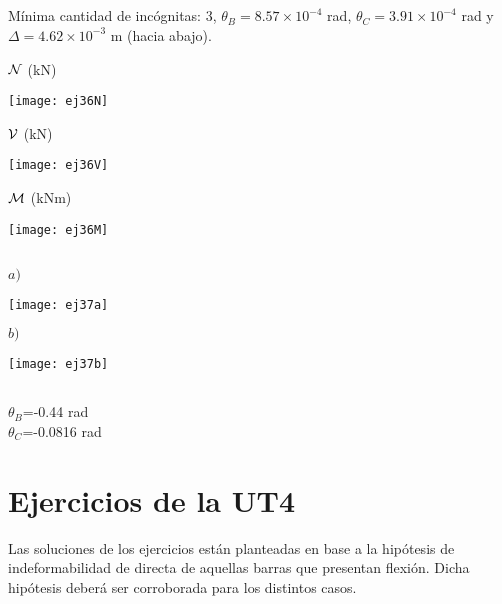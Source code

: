 \subsection{}

Mínima cantidad de incógnitas: 3, $\theta_B = 8.57 \times 10^{-4}$ rad, $\theta_C = 3.91 \times 10^{-4}$ rad y $\Delta  = 4.62 \times 10^{-3} $ m (hacia abajo).

${\mathcal N}$ (kN)

\begin{center}
	\texttt{[image: ej36N]}
\end{center}

${\mathcal V}$ (kN)

\begin{center}
	\texttt{[image: ej36V]}
\end{center}

${\mathcal M}$ (kNm)

\begin{center}
	\texttt{[image: ej36M]}
\end{center}


\subsection{}

$a)$

\begin{center}
	\texttt{[image: ej37a]}
\end{center}

$b)$

\begin{center}
	\texttt{[image: ej37b]}
\end{center}

\subsection{}

$\theta_B$=-0.44 rad \\
$\theta_C$=-0.0816 rad


\section{Ejercicios de la UT4}

Las soluciones de los ejercicios están planteadas en base a la hipótesis de indeformabilidad de directa de aquellas barras que presentan flexión. Dicha hipótesis deberá ser corroborada para los distintos casos.

